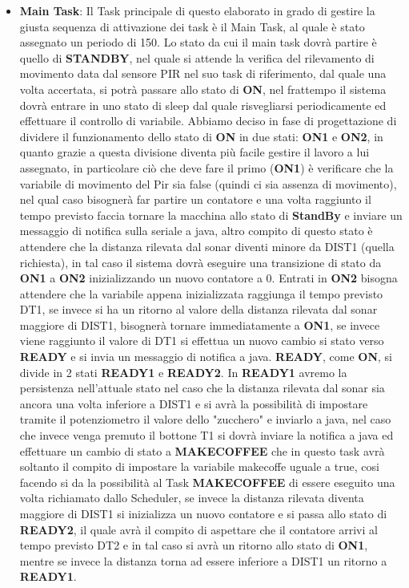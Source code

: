 \documentclass[a4paper]{article}
\begin{document}
\begin{itemize}
\item \textbf{Main Task}:
Il Task principale di questo elaborato in grado di gestire la giusta sequenza di attivazione dei task è il Main Task, al quale è stato assegnato un periodo di 150.
Lo stato da cui il main task dovrà partire è quello di \textbf{STANDBY}, nel quale si attende la verifica del rilevamento di movimento data dal sensore PIR nel suo task di riferimento, dal quale una volta accertata, si potrà passare allo stato di \textbf{ON}, nel frattempo il sistema dovrà entrare in uno stato di sleep dal quale risvegliarsi periodicamente ed effettuare il controllo di variabile.
Abbiamo deciso in fase di progettazione di dividere il funzionamento dello stato di \textbf{ON} in due stati: \textbf{ON1} e \textbf{ON2}, in quanto grazie a questa divisione diventa più facile gestire il lavoro a lui assegnato, in particolare ciò che deve fare il primo (\textbf{ON1}) è verificare che la variabile di movimento del Pir sia false (quindi ci sia assenza di movimento), nel qual caso bisognerà far partire un contatore e una volta raggiunto il tempo previsto faccia tornare la macchina allo stato di \textbf{StandBy} e inviare un messaggio di notifica sulla seriale a java, altro compito di questo stato è attendere che la distanza rilevata dal sonar diventi minore da DIST1 (quella richiesta), in tal caso il sistema dovrà eseguire una transizione di stato da \textbf{ON1} a \textbf{ON2} inizializzando un nuovo contatore a 0.
Entrati in \textbf{ON2} bisogna attendere che la variabile appena inizializzata raggiunga il tempo previsto DT1, se invece si ha un ritorno al valore della distanza rilevata dal sonar maggiore di DIST1, bisognerà tornare immediatamente a \textbf{ON1}, se invece viene raggiunto il valore di DT1 si effettua un nuovo cambio si stato verso \textbf{READY} e si invia un messaggio di notifica a java.
\textbf{READY}, come \textbf{ON}, si divide in 2 stati \textbf{READY1} e \textbf{READY2}. In \textbf{READY1} avremo la persistenza nell'attuale stato nel caso che la distanza rilevata dal sonar sia ancora una volta inferiore a DIST1 e si avrà la possibilità di impostare tramite il potenziometro il valore dello "zucchero" e inviarlo a java, nel caso che invece venga premuto il bottone T1 si dovrà inviare la notifica a java ed effettuare un cambio di stato a \textbf{MAKECOFFEE} che in questo task avrà soltanto il compito di impostare la variabile makecoffe uguale a true, cosi facendo si da la possibilità al Task \textbf{MAKECOFFEE} di essere eseguito una volta richiamato dallo Scheduler, se invece la distanza rilevata diventa maggiore di DIST1 si inizializza un nuovo contatore e si passa allo stato di \textbf{READY2}, il quale avrà il compito di aspettare che il contatore arrivi al tempo previsto DT2 e in tal caso si avrà un ritorno allo stato di \textbf{ON1}, mentre se invece la distanza torna ad essere inferiore a DIST1 un ritorno a \textbf{READY1}.

\end{itemize}
\end{document}
